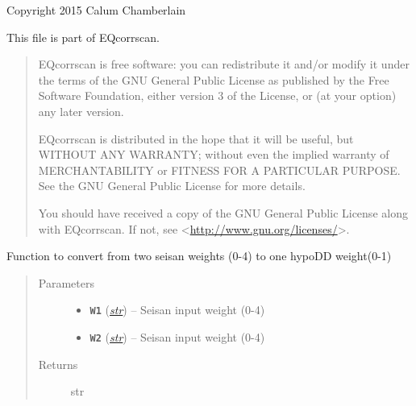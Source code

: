 \documentclass[a4paper,10pt,english]{sphinxmanual}
\begin{document}
Copyright 2015 Calum Chamberlain

This file is part of EQcorrscan.
\begin{quote}

EQcorrscan is free software: you can redistribute it and/or modify
it under the terms of the GNU General Public License as published by
the Free Software Foundation, either version 3 of the License, or
(at your option) any later version.

EQcorrscan is distributed in the hope that it will be useful,
but WITHOUT ANY WARRANTY; without even the implied warranty of
MERCHANTABILITY or FITNESS FOR A PARTICULAR PURPOSE.  See the
GNU General Public License for more details.

You should have received a copy of the GNU General Public License
along with EQcorrscan.  If not, see \textless{}\href{http://www.gnu.org/licenses/}{http://www.gnu.org/licenses/}\textgreater{}.
\end{quote}

\begin{fulllineitems}
\label{submodules/utils.catalogue2DD:catalogue2DD._av_weight}
Function to convert from two seisan weights (0-4) to one hypoDD weight(0-1)
\begin{quote}\begin{description}
\item[{Parameters}] \leavevmode\begin{itemize}
\item {} 
\textbf{\texttt{W1}} (\href{https://docs.python.org/library/functions.html\#str}{\emph{str}}) -- Seisan input weight (0-4)

\item {} 
\textbf{\texttt{W2}} (\href{https://docs.python.org/library/functions.html\#str}{\emph{str}}) -- Seisan input weight (0-4)

\end{itemize}

\item[{Returns}] \leavevmode
str

\end{description}\end{quote}

\end{fulllineitems}

\end{document}
